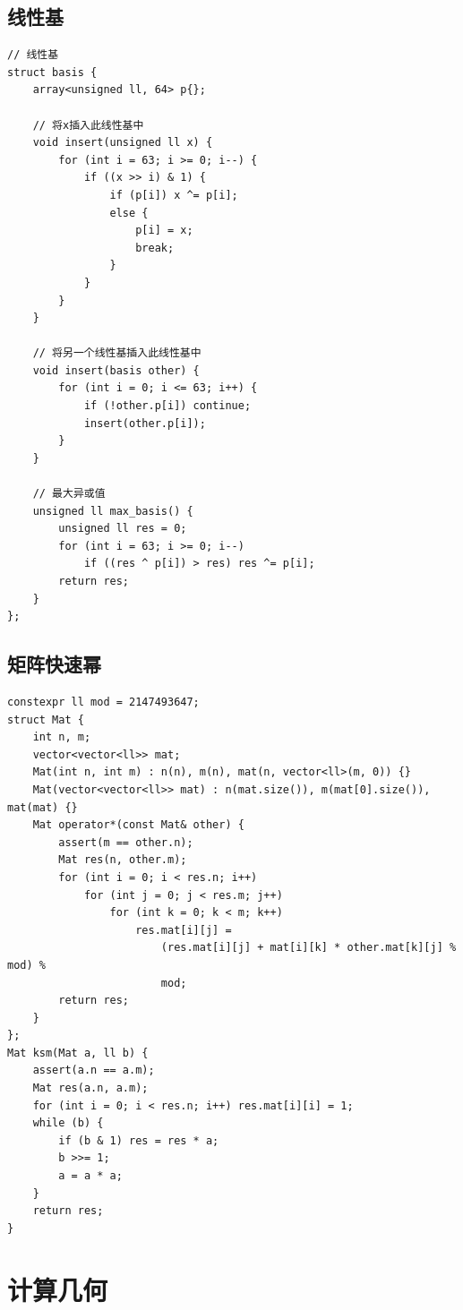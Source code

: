 \documentclass[UTF8]{ctexart}
\begin{document}
\begin{sloppypar}
\subsection{线性基}

\begin{lstlisting}[style=cpp]
// 线性基
struct basis {
    array<unsigned ll, 64> p{};

    // 将x插入此线性基中
    void insert(unsigned ll x) {
        for (int i = 63; i >= 0; i--) {
            if ((x >> i) & 1) {
                if (p[i]) x ^= p[i];
                else {
                    p[i] = x;
                    break;
                }
            }
        }
    }

    // 将另一个线性基插入此线性基中
    void insert(basis other) {
        for (int i = 0; i <= 63; i++) {
            if (!other.p[i]) continue;
            insert(other.p[i]);
        }
    }

    // 最大异或值
    unsigned ll max_basis() {
        unsigned ll res = 0;
        for (int i = 63; i >= 0; i--)
            if ((res ^ p[i]) > res) res ^= p[i];
        return res;
    }
};
\end{lstlisting}

\subsection{矩阵快速幂}

\begin{lstlisting}[style=cpp]
constexpr ll mod = 2147493647;
struct Mat {
    int n, m;
    vector<vector<ll>> mat;
    Mat(int n, int m) : n(n), m(n), mat(n, vector<ll>(m, 0)) {}
    Mat(vector<vector<ll>> mat) : n(mat.size()), m(mat[0].size()), mat(mat) {}
    Mat operator*(const Mat& other) {
        assert(m == other.n);
        Mat res(n, other.m);
        for (int i = 0; i < res.n; i++)
            for (int j = 0; j < res.m; j++)
                for (int k = 0; k < m; k++)
                    res.mat[i][j] =
                        (res.mat[i][j] + mat[i][k] * other.mat[k][j] % mod) %
                        mod;
        return res;
    }
};
Mat ksm(Mat a, ll b) {
    assert(a.n == a.m);
    Mat res(a.n, a.m);
    for (int i = 0; i < res.n; i++) res.mat[i][i] = 1;
    while (b) {
        if (b & 1) res = res * a;
        b >>= 1;
        a = a * a;
    }
    return res;
}
\end{lstlisting}

\section{计算几何}


\end{sloppypar}
\end{document}
